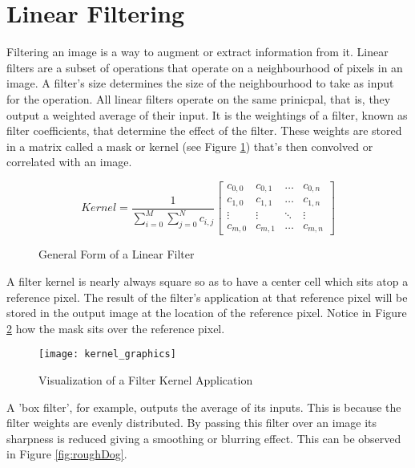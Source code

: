 \section{Linear Filtering}

Filtering an image is a way to augment or extract information from it. Linear filters are a subset of operations that operate on a neighbourhood of pixels in an image. A filter's size determines the size of the neighbourhood to take as input for the operation. All linear filters operate on the same prinicpal, that is, they output a weighted average of their input. It is the weightings of a filter, known as filter coefficients, that determine the effect of the filter. These weights are stored in a matrix called a mask or kernel (see Figure \ref{fig:generalForm}) that's then convolved or correlated with an image.

\begin{figure}[h]
  
   \[ 
     Kernel  = \frac{1}{\sum\limits_{i=0}^{M}\sum\limits_{j=0}^{N}c_{i,j}}
    \begin{bmatrix}
      c_{0,0} & c_{0,1} & \dots & c_{0,n} \\
      c_{1,0} & c_{1,1} & \dots & c_{1,n} \\
      \vdots & \vdots & \ddots & \vdots \\
      c_{m,0} & c_{m,1} & \dots & c_{m,n}
    \end{bmatrix}
  \]
  \caption{General Form of a Linear Filter}
  \label{fig:generalForm}
\end{figure}

 A filter kernel is nearly always square so as to have a center cell which sits atop a reference pixel. The result of the filter's application at that reference pixel will be stored in the output image at the location of the reference pixel. Notice in Figure \ref{fig:kernel_graphics} how the mask sits over the reference pixel.

\begin{figure}[H]
  \centering
  \centering\texttt{[image: kernel\_graphics]}
  \caption{Visualization of a Filter Kernel Application}
  \label{fig:kernel_graphics}
\end{figure}

A 'box filter', for example, outputs the average of its inputs. This is because the filter weights are evenly distributed. By passing this filter over an image its sharpness is reduced giving a smoothing or blurring effect. This can be observed in Figure \ref{fig:roughDog}.

